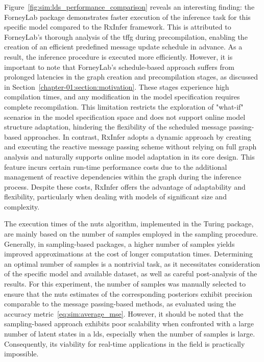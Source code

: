 Figure~\ref{fig:sim:lds_performance_comparison} reveals an interesting finding: the ForneyLab
package demonstrates faster execution of the inference task for this specific model compared
to the RxInfer framework.
This is attributed to ForneyLab's thorough analysis of the \ac{tffg} during precompilation,
enabling the creation of an efficient predefined message update schedule in advance.
As a result, the inference procedure is executed more efficiently.
However, it is important to note that ForneyLab's schedule-based approach suffers from
prolonged latencies in the graph creation and precompilation stages, as discussed in
Section~\ref{chapter-01:section:motivation}.
These stages experience high compilation times, and any modification in the model
specification requires complete recompilation.
This limitation restricts the exploration of "what-if" scenarios in the model specification
space and does not support online model structure adaptation, hindering the flexibility of the
scheduled message passing-based approaches.
In contrast, RxInfer adopts a dynamic approach by creating and executing the reactive message
passing scheme without relying on full graph analysis and naturally supports online model adaptation
in its core design.
This feature incurs certain run-time performance costs due to the additional management of reactive dependencies within the graph
during the inference process.
Despite these costs, RxInfer offers the advantage of adaptability and flexibility,
particularly when dealing with models of significant size and complexity.

The execution times of the \ac{nuts} algorithm, implemented in the Turing package, are mainly based
on the number of samples employed in the sampling procedure.
Generally, in sampling-based packages, a higher number of samples yields improved
approximations at the cost of longer computation times.
Determining an optimal number of samples is a nontrivial task, as it necessitates
consideration of the specific model and available dataset, as well as careful post-analysis of
the results.
For this experiment, the number of samples was manually selected to ensure that the
\ac{nuts} estimates of the corresponding posteriors exhibit precision comparable to the
message passing-based methods, as evaluated using the accuracy
metric~\eqref{eq:sim:average_mse}.
However, it should be noted that the sampling-based approach exhibits poor scalability when
confronted with a large number of latent states in a \ac{lds}, especially when the number of samples is large.
Consequently, its viability for real-time applications in the field is practically impossible.


